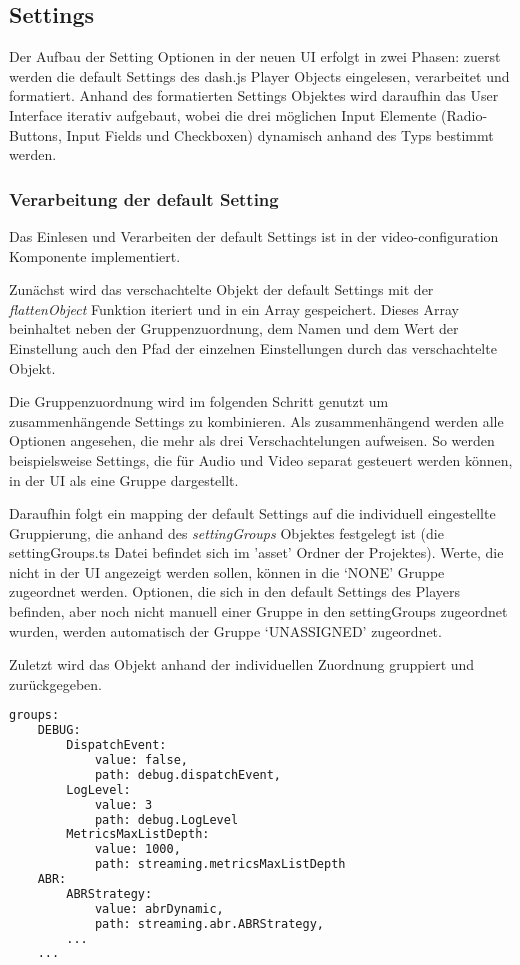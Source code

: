 \documentclass[conference]{IEEEtran}
\begin{document}
\subsection{Settings}
Der Aufbau der Setting Optionen in der neuen UI erfolgt in zwei Phasen: zuerst werden die default Settings des dash.js Player Objects eingelesen, verarbeitet und formatiert. Anhand des formatierten Settings Objektes wird daraufhin das User Interface iterativ aufgebaut, wobei die drei möglichen Input Elemente (Radio-Buttons, Input Fields und Checkboxen) dynamisch anhand des Typs bestimmt werden. 

\subsubsection{Verarbeitung der default Setting}
Das Einlesen und Verarbeiten der default Settings ist in der video-configuration Komponente implementiert. 

Zunächst wird das verschachtelte Objekt der default Settings mit der \textit{flattenObject} Funktion iteriert und in ein Array gespeichert. 
Dieses Array beinhaltet neben der Gruppenzuordnung, dem Namen und dem Wert der Einstellung auch den Pfad der einzelnen Einstellungen durch das verschachtelte Objekt. 

Die Gruppenzuordnung wird im folgenden Schritt genutzt um zusammenhängende Settings zu kombinieren. Als zusammenhängend werden alle Optionen angesehen, die mehr als drei Verschachtelungen aufweisen. So werden beispielsweise Settings, die für Audio und Video separat gesteuert werden können, in der UI als eine Gruppe dargestellt.

Daraufhin folgt ein mapping der default Settings auf die individuell eingestellte Gruppierung, die anhand des \textit{settingGroups} 
Objektes festgelegt ist (die settingGroups.ts Datei befindet sich im 'asset' Ordner der Projektes). Werte, die nicht in der UI angezeigt werden sollen, können in die ‘NONE’ Gruppe zugeordnet werden. Optionen, die sich in den default Settings des Players befinden, aber noch nicht manuell einer Gruppe in den settingGroups zugeordnet wurden, werden automatisch der Gruppe ‘UNASSIGNED’ zugeordnet.

Zuletzt wird das Objekt anhand der individuellen Zuordnung gruppiert und zurückgegeben.

\begin{lstlisting}[language=xml, caption=Logischer Aufbau des Setting-Objektes nach Verarbeitung, basicstyle=\small]
groups:
    DEBUG:
        DispatchEvent: 
            value: false, 
            path: debug.dispatchEvent,
        LogLevel: 
            value: 3
            path: debug.LogLevel
        MetricsMaxListDepth:
            value: 1000,
            path: streaming.metricsMaxListDepth
    ABR: 
        ABRStrategy: 
            value: abrDynamic,
            path: streaming.abr.ABRStrategy,
        ...
    ...
\end{lstlisting}
\end{document}
